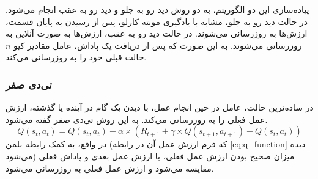پیاده‌سازی این دو الگوریتم، به دو روش دید رو به جلو و دید رو به عقب انجام می‌شود.
در حالت دید رو به جلو، مشابه با یادگیری مونته کارلو، پس از رسیدن به پایان قسمت، ارزش‌ها به روزرسانی می‌شوند.
در حالت دید رو به عقب، ارزش‌ها به صورت آنلاین به روزرسانی می‌شوند. به این صورت که پس از دریافت یک پاداش، عامل مقادیر کیو $n$ حالت‌ قبلی خود را به روزرسانی می‌کند.
\subsubsection{تی‌دی صفر}
در ساده‌ترین حالت، عامل در حین انجام عمل، با دیدن یک گام در آینده یا گذشته، ارزش عمل فعلی را به روزرسانی می‌کند.
به این روش تی‌دی صفر  گفته می‌شود.
\begin{equation}\label{eq:td_zero_q_function}
    Q(s_t, a_t) = Q(s_t, a_t) + \alpha \times (R_{t+1} + \gamma \times Q(s_{t+1}, a_{t+1}) - Q(s_t, a_t))
\end{equation}
در واقع، به کمک رابطه بلمن
(که فرم ارزش عمل آن در رابطه  \ref{eq:q_function} دیده می‌شود)
میزان صحیح بودن ارزش عمل فعلی، با ارزش عمل بعدی و پاداش فعلی مقایسه می‌شود و ارزش عمل فعلی به روزرسانی می‌شود.
